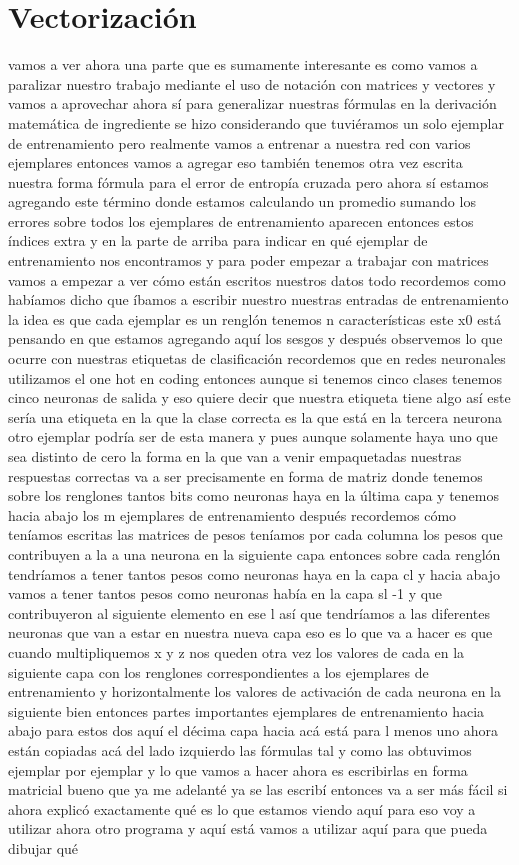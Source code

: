 \section{Vectorización}
vamos a ver ahora una parte que es sumamente interesante es como vamos a paralizar nuestro trabajo mediante el uso de notación con matrices y vectores y vamos a aprovechar ahora sí para generalizar nuestras fórmulas en la derivación matemática de ingrediente se hizo considerando que tuviéramos un solo ejemplar de entrenamiento pero realmente vamos a entrenar a nuestra red con varios ejemplares entonces vamos a agregar eso también tenemos otra vez escrita nuestra forma fórmula para el error de entropía cruzada pero ahora sí estamos agregando este término donde estamos calculando un promedio sumando los errores sobre todos los ejemplares de entrenamiento aparecen entonces estos índices extra y en la parte de arriba para indicar en qué ejemplar de entrenamiento nos encontramos y para poder empezar a trabajar con matrices vamos a empezar a ver cómo están escritos nuestros datos todo recordemos como habíamos dicho que íbamos a escribir nuestro nuestras entradas de entrenamiento la idea es que cada ejemplar es un renglón tenemos n características este x0 está pensando en que estamos agregando aquí los sesgos y después observemos lo que ocurre con nuestras etiquetas de clasificación recordemos que en redes neuronales utilizamos el one hot en coding entonces aunque si tenemos cinco clases tenemos cinco neuronas de salida y eso quiere decir que nuestra etiqueta tiene algo así este sería una etiqueta en la que la clase correcta es la que está en la tercera neurona otro ejemplar podría ser de esta manera y pues aunque solamente haya uno que sea distinto de cero la forma en la que van a venir empaquetadas nuestras respuestas correctas va a ser precisamente en forma de matriz donde tenemos sobre los renglones tantos bits como neuronas haya en la última capa y tenemos hacia abajo los m ejemplares de entrenamiento después recordemos cómo teníamos escritas las matrices de pesos teníamos por cada columna los pesos que contribuyen a la a una neurona en la siguiente capa entonces sobre cada renglón tendríamos a tener tantos pesos como neuronas haya en la capa cl y hacia abajo vamos a tener tantos pesos como neuronas había en la capa sl -1 y que contribuyeron al siguiente elemento en ese l así que tendríamos a las diferentes neuronas que van a estar en nuestra nueva capa eso es lo que va a hacer es que cuando multipliquemos x y z nos queden otra vez los valores de cada en la siguiente capa con los renglones correspondientes a los ejemplares de entrenamiento y horizontalmente los valores de activación de cada neurona en la siguiente bien entonces partes importantes ejemplares de entrenamiento hacia abajo para estos dos aquí el décima capa hacia acá está para l menos uno ahora están copiadas acá del lado izquierdo las fórmulas tal y como las obtuvimos ejemplar por ejemplar y lo que vamos a hacer ahora es escribirlas en forma matricial bueno que ya me adelanté ya se las escribí entonces va a ser más fácil si ahora explicó exactamente qué es lo que estamos viendo aquí para eso voy a utilizar ahora otro programa y aquí está vamos a utilizar aquí para que pueda dibujar qué 